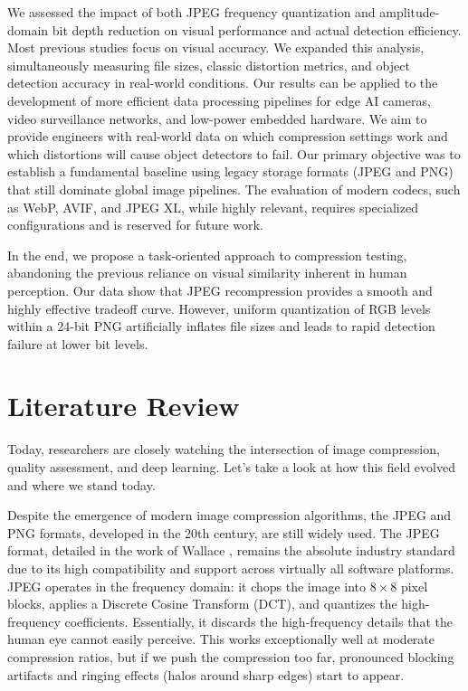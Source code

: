 \documentclass[12pt, a4paper]{article}
\begin{document}
We assessed the impact of both JPEG frequency quantization and amplitude-domain bit depth reduction on visual performance and actual detection efficiency. Most previous studies focus on visual accuracy. We expanded this analysis, simultaneously measuring file sizes, classic distortion metrics, and object detection accuracy in real-world conditions. Our results can be applied to the development of more efficient data processing pipelines for edge AI cameras, video surveillance networks, and low-power embedded hardware. We aim to provide engineers with real-world data on which compression settings work and which distortions will cause object detectors to fail.
Our primary objective was to establish a fundamental baseline using legacy storage formats (JPEG and PNG) that still dominate global image pipelines. The evaluation of modern codecs, such as WebP, AVIF, and JPEG XL, while highly relevant, requires specialized configurations and is reserved for future work.

In the end, we propose a task-oriented approach to compression testing, abandoning the previous reliance on visual similarity inherent in human perception. Our data show that JPEG recompression provides a smooth and highly effective tradeoff curve. However, uniform quantization of RGB levels within a 24-bit PNG artificially inflates file sizes and leads to rapid detection failure at lower bit levels.

\section{Literature Review}
Today, researchers are closely watching the intersection of image compression, quality assessment, and deep learning. Let's take a look at how this field evolved and where we stand today.

Despite the emergence of modern image compression algorithms, the JPEG and PNG formats, developed in the 20th century, are still widely used. The JPEG format, detailed in the work of Wallace \cite{wallace1992}, remains the absolute industry standard due to its high compatibility and support across virtually all software platforms. JPEG operates in the frequency domain: it chops the image into $8\times8$ pixel blocks, applies a Discrete Cosine Transform (DCT), and quantizes the high-frequency coefficients. Essentially, it discards the high-frequency details that the human eye cannot easily perceive. This works exceptionally well at moderate compression ratios, but if we push the compression too far, pronounced blocking artifacts and ringing effects (halos around sharp edges) start to appear.
\end{document}
